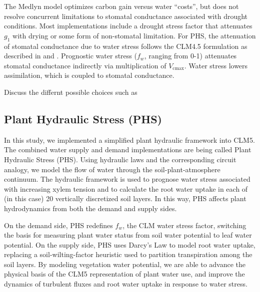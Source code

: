 \documentclass[draft,linenumbers]{agujournal}
\begin{document}
    The Medlyn model optimizes carbon gain versus water ``costs'', but does not resolve concurrent limitations to stomatal conductance
    associated with drought conditions.
    Most implementations include a drought stress factor that attenuates $g_1$ with drying or some form of non-stomatal limitation.
    For PHS, the attenuation of stomatal conductance due to water stress follows the CLM4.5 formulation as described in \citet{oleson2013} and \citet{bonan2011}. 
    Prognostic water stress ($f_w$, ranging from 0-1) attenuates stomatal conductance indirectly via multiplication of $V_{\text{cmax}}$.
    Water stress lowers assimilation, which is coupled to stomatal conductance.
    
    Discuss the differnt possible choices such as 

\subsection{Plant Hydraulic Stress (PHS)}
  In this study, we implemented a simplified plant hydraulic framework into CLM5.
  The combined water supply and demand implementations are being called Plant Hydraulic Stress (PHS).
  Using hydraulic laws and the corresponding circuit analogy, we model the 
  flow of water through the soil-plant-atmosphere continuum. 
  The hydraulic framework is used to prognose water stress associated with increasing xylem tension
  and to calculate the root water uptake in each of (in this case) 20 vertically discretized soil layers.
  In this way, PHS affects plant hydrodynamics from both the demand and supply sides.

  On the demand side, PHS redefines $f_w$, the CLM water stress factor, switching the basis for measuring plant water status from soil water potential to leaf water potential.
  On the supply side, PHS uses Darcy's Law to model root water uptake, replacing a soil-wilting-factor heuristic used to partition transpiration among the soil layers.
  By modeling vegetation water potential, we are able to advance the physical basis of the CLM5 representation of plant water use, and improve the dynamics of turbulent fluxes and root water uptake in response to water stress. 
\end{document}
